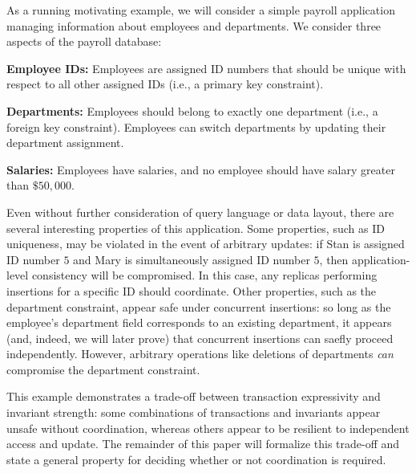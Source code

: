 


 As a running motivating example, we will
consider a simple payroll application managing information about
employees and departments. We consider three aspects of the payroll
database:
\begin{myitemize}
\item\textbf{Employee IDs:} Employees are assigned ID numbers that
  should be unique with respect to all other assigned IDs (i.e., a
  primary key constraint).
\item\textbf{Departments:} Employees should belong to exactly one
  department (i.e., a foreign key constraint). Employees can switch
  departments by updating their department assignment.
\item\textbf{Salaries:} Employees have salaries, and no employee
  should have salary greater than $\$50,000$.
\end{myitemize}
Even without further consideration of query language or data layout,
there are several interesting properties of this application. Some
properties, such as ID uniqueness, may be violated in the event of
arbitrary updates: if Stan is assigned ID number $5$ and Mary is
simultaneously assigned ID number $5$, then application-level
consistency will be compromised. In this case, any replicas performing
insertions for a specific ID should coordinate. Other properties, such
as the department constraint, appear safe under concurrent insertions:
so long as the employee's department field corresponds to an existing
department, it appears (and, indeed, we will later prove) that
concurrent insertions can saefly proceed independently. However,
arbitrary operations like deletions of departments \textit{can}
compromise the department constraint.

This example demonstrates a trade-off between transaction expressivity
and invariant strength: some combinations of transactions and
invariants appear unsafe without coordination, whereas others appear
to be resilient to independent access and update. The remainder of this paper
will formalize this trade-off and state a general
property for deciding whether or not coordination is required.
